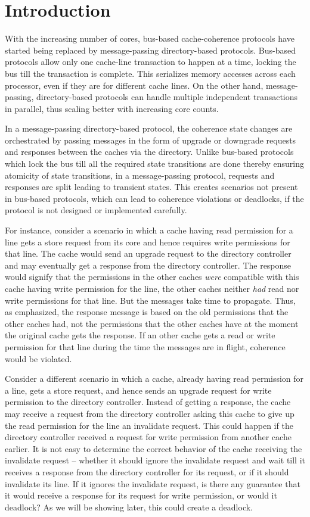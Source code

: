 \section{Introduction} With the increasing number of cores, bus-based
cache-coherence protocols have started being replaced by message-passing
directory-based protocols. Bus-based protocols allow only one cache-line
transaction to happen at a time, locking the bus till the transaction is
complete. This serializes memory accesses across each processor, even if they
are for different cache lines. On the other hand, message-passing,
directory-based protocols can handle multiple independent transactions in
parallel, thus scaling better with increasing core counts.

In a message-passing directory-based protocol, the coherence state changes are
orchestrated by passing messages in the form of upgrade or downgrade requests
and responses between the caches via the directory. Unlike bus-based protocols
which lock the bus till all the required state transitions are done thereby
ensuring atomicity of state transitions, in a message-passing protocol, requests
and responses are split leading to transient states. This creates scenarios not
present in bus-based protocols, which can lead to coherence violations or
deadlocks, if the protocol is not designed or implemented carefully.

For instance, consider a scenario in which a cache having read permission for
a line gets a store request from its core and hence requires write permissions
for that line. The cache would send an upgrade request to the directory
controller and may eventually get a response from the directory controller. The
response would signify that the permissions in the other caches \emph{were}
compatible with this cache having write permission for the line, \ie the other
caches neither \emph{had} read nor write permissions for that line. But the messages
take time to propagate. Thus, as emphasized, the response message is based on
the old permissions that the other caches had, not the permissions that the
other caches have at the moment the original cache gets the response. If an
other cache gets a read or write permission for that line during the time the
messages are in flight, coherence would be violated.

Consider a different scenario in which a cache, already having read permission
for a line, gets a store request, and hence sends an upgrade request for write
permission to the directory controller. Instead of getting a response, the cache
may receive a request from the directory controller asking this cache to give up
the read permission for the line \ie an invalidate request. This could happen if
the directory controller received a request for write permission from another
cache earlier. It is not easy to determine the correct behavior of the cache
receiving the invalidate request -- whether it should ignore the invalidate
request and wait till it receives a response from the directory controller for
its request, or if it should invalidate its line. If it ignores the invalidate
request, is there any guarantee that it would receive a response for its request
for write permission, or would it deadlock? As we will be showing later, this
could create a deadlock.

